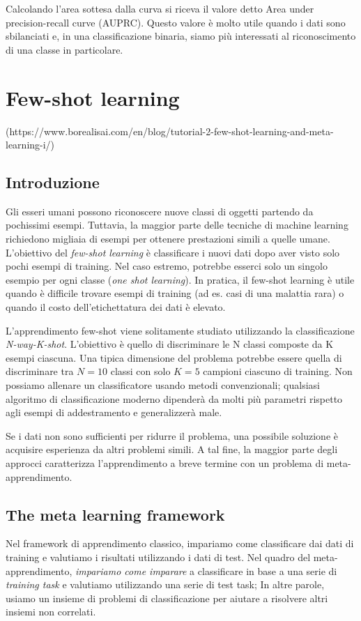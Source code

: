 \documentclass[12pt,a4paper,titlepage]{article}
\begin{document}
Calcolando l'area sottesa dalla curva si riceva il valore detto Area under precision-recall curve (AUPRC).
Questo valore è molto utile quando i dati sono sbilanciati e, in una classificazione binaria, siamo più interessati al riconoscimento di una classe in particolare.
\section{Few-shot learning}
\label{section:Few-shot}
(https://www.borealisai.com/en/blog/tutorial-2-few-shot-learning-and-meta-learning-i/)
\subsection{Introduzione}
Gli esseri umani possono riconoscere nuove classi di oggetti partendo da pochissimi esempi. Tuttavia, la maggior parte delle tecniche di machine learning richiedono migliaia di esempi per ottenere prestazioni simili a quelle umane. L'obiettivo del \emph{few-shot learning} è classificare i nuovi dati dopo aver visto solo pochi esempi di training. Nel caso estremo, potrebbe esserci solo un singolo esempio per ogni classe (\emph{one shot learning}). In pratica, il few-shot learning è utile quando è difficile trovare esempi di training (ad es. casi di una malattia rara) o quando il costo dell'etichettatura dei dati è elevato.

L'apprendimento few-shot viene solitamente studiato utilizzando la classificazione \emph{N-way-K-shot}. L'obiettivo è quello di discriminare le N classi composte da K esempi ciascuna. Una tipica dimensione del problema potrebbe essere quella di discriminare tra $N=10$ classi con solo $K=5$ campioni ciascuno di training. Non possiamo allenare un classificatore usando metodi convenzionali; qualsiasi algoritmo di classificazione moderno dipenderà da molti più parametri rispetto agli esempi di addestramento e generalizzerà male.

Se i dati non sono sufficienti per ridurre il problema, una possibile soluzione è acquisire esperienza da altri problemi simili. A tal fine, la maggior parte degli approcci caratterizza l'apprendimento a breve termine con un problema di meta-apprendimento.

\subsection{The meta learning framework}
Nel framework di apprendimento classico, impariamo come classificare dai dati di training e valutiamo i risultati utilizzando i dati di test. Nel quadro del meta-apprendimento, \textit{impariamo come imparare} a classificare in base a una serie di \textit{training task} e valutiamo utilizzando una serie di test task; In altre parole, usiamo un insieme di problemi di classificazione per aiutare a risolvere altri insiemi non correlati.
\end{document}
